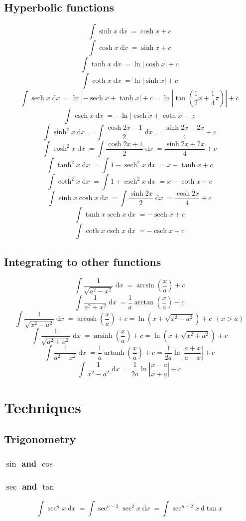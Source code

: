 \documentclass[fleqn, 11pt]{article}
\DeclareMathOperator\dx{\mathrm{d}\mathit{x}}
\DeclareMathOperator\sech{sech}
\DeclareMathOperator\csch{csch}
\DeclareMathOperator\arsinh{arsinh}
\DeclareMathOperator\arcosh{arcosh}
\DeclareMathOperator\artanh{artanh}
\begin{document}
\subsection{Hyperbolic functions}
\[\int\sinh x \dx = \cosh x + c\]
\[\int\cosh x \dx = \sinh x + c\]
\[\int \tanh x \dx = \ln |\cosh x| + c\]
\[\int \coth x \dx = \ln |\sinh x| + c\]
\[\int \sech x \dx = \ln |-\sech x + \tanh x| + c = \ln \left|\tan\left(\frac{1}{2}x+\frac{1}{4}\pi \right)\right| + c\]
\[\int \csch x \dx = -\ln|\csch x + \coth x| + c\]
\[\int \sinh^2 x \dx = \int \frac{\cosh 2x - 1}{2} \dx = \frac{\sinh 2x - 2x}{4} + c\]
\[\int \cosh^2 x \dx = \int \frac{\cosh 2x + 1}{2} \dx = \frac{\sinh 2x + 2x}{4} + c\]
\[\int \tanh^2 x \dx = \int 1-\sech^2 x \dx = x - \tanh x + c\]
\[\int \coth^2 x \dx = \int 1+\csch^2 x \dx = x - \coth x + c\]
\[\int \sinh x \cosh x \dx = \int \frac{\sinh 2x}{2} \dx = \dfrac{\cosh 2x}{4} + c\]
\[\int \tanh x \sech x \dx = -\sech x + c\]
\[\int \coth x \csch x \dx = -\csch x + c\]



\subsection{Integrating to other functions}
\[\int \frac{1}{\sqrt{a^2-x^2}} \dx=\arcsin \left(\frac{x}{a}\right) + c \]
\[\int \frac{1}{a^2+x^2} \dx= \frac{1}{a}\arctan \left(\frac{x}{a}\right) + c \]
\[\int \frac{1}{\sqrt{x^2-a^2}} \dx= \arcosh \left(\frac{x}{a}\right) + c = \ln \left(x + \sqrt{x^2-a^2}\right) + c \:\:  (x>a)\]
\[\int \frac{1}{\sqrt{a^2+x^2}} \dx= \arsinh \left(\frac{x}{a}\right) + c = \ln \left(x + \sqrt{x^2+a^2}\right) + c \]
\[\int \frac{1}{a^2-x^2} \dx=\frac{1}{a}\artanh \left(\frac{x}{a}\right) + c = \frac{1}{2a}\ln \left|\frac{a+x}{a-x}\right| + c\]
\[\int \frac{1}{x^2-a^2} \dx= \frac{1}{2a}\ln \left|\frac{x-a}{x+a}\right| + c\]

\pagebreak

\section{Techniques}
\subsection{Trigonometry}
\subsubsection{$\sin$ and $\cos$}


\subsubsection{$\sec$ and $\tan$}
\[\int \sec^n x \dx = \int \sec^{n-2} \sec^2 x \dx = \int \sec^{n-2} x \: \mathrm{d} \tan x\]
\end{document}
